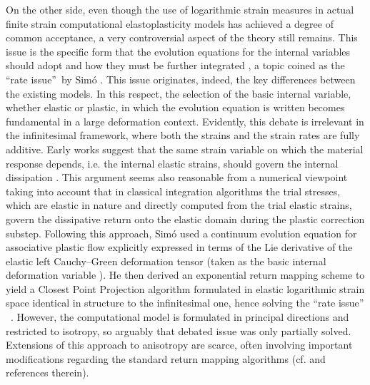 \documentclass[preprint,review,12pt,sort&compress]{elsarticle}%
\begin{document}
On the other side, even though the use of logarithmic strain measures in
actual finite strain computational elastoplasticity models has achieved a
degree of common acceptance, a very controversial aspect of the theory still
remains. This issue is the specific form that the evolution equations for the
internal variables should adopt and how they must be further integrated
\cite{Bruhns15}, a topic coined as the \textquotedblleft rate
issue\textquotedblright\ by Sim\'{o} \cite{Simo92}. This issue originates,
indeed, the key differences between the existing models. In this respect, the
selection of the basic internal variable, whether elastic or plastic, in which
the evolution equation is written becomes fundamental in a large deformation
context. Evidently, this debate is irrelevant in the infinitesimal framework,
where both the strains and the strain rates are fully additive. Early works
\cite{Eckart48,Besseling66,Leonov76} suggest that the same strain variable on
which the material response depends, i.e. the internal elastic strains, should
govern the internal dissipation \cite{Rubin16}. This argument seems also
reasonable from a numerical viewpoint taking into account that in classical
integration algorithms \cite{Wilkins64,MaenchenSacks64,KriegKey76} the trial
stresses, which are elastic in nature and directly computed from the trial
elastic strains, govern the dissipative return onto the elastic domain during
the plastic correction substep. Following this approach, Sim\'{o}
\cite{Simo92} used a continuum evolution equation for associative plastic flow
explicitly expressed in terms of the Lie derivative of the elastic left
Cauchy--Green deformation tensor (taken as the basic internal deformation
variable \cite{SimoMiehe92}). He then derived an exponential return mapping
scheme to yield a Closest Point Projection algorithm formulated in elastic
logarithmic strain space identical in structure to the infinitesimal one,
hence solving the \textquotedblleft rate issue\textquotedblright%
\ \cite{Simo92}. However, the computational model is formulated in principal
directions and restricted to isotropy, so arguably that debated issue was only
partially solved. Extensions of this approach to anisotropy are scarce, often
involving important modifications regarding the standard return mapping
algorithms (cf. \cite{Rubin16} and references therein).
\end{document}
